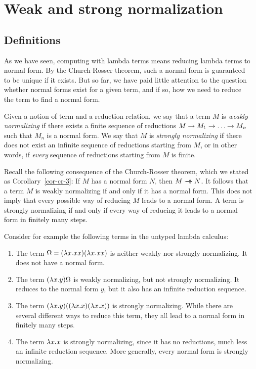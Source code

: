 \documentclass{article}
\begin{document}
\section{Weak and strong normalization}

\subsection{Definitions}

As we have seen, computing with lambda terms means reducing lambda
terms to normal form. By the Church-Rosser theorem, such a normal form
is guaranteed to be unique if it exists. But so far, we have paid
little attention to the question whether normal forms exist for a
given term, and if so, how we need to reduce the term to find a normal
form. 

\begin{definition}
  Given a notion of term and a reduction relation, we say that a term
  $M$ is {\em weakly normalizing} if there exists a finite sequence of
  reductions $M\rightarrow M_1\rightarrow\ldots\rightarrow M_n$ such that $M_n$ is a normal
  form. We say that $M$ is {\em strongly normalizing} if there does
  not exist an infinite sequence of reductions starting from $M$, or
  in other words, if {\em every} sequence of reductions starting from
  $M$ is finite. 
\end{definition}

Recall the following consequence of the Church-Rosser theorem, which
we stated as Corollary~\ref{cor-cr-3}: If $M$ has a normal form $N$,
then $M\mathrel{\rightarrow\!\!\!\!\!\rightarrow} N$. It follows that a term $M$ is weakly normalizing if
and only if it has a normal form. This does not imply that every
possible way of reducing $M$ leads to a normal form. A term is
strongly normalizing if and only if every way of reducing it leads to
a normal form in finitely many steps. 

Consider for example the following terms in the untyped lambda
calculus:
\begin{enumerate}
\item The term $\Omega=(\lambda x.xx)(\lambda x.xx)$ is neither weakly nor
  strongly normalizing. It does not have a normal form.
\item The term $(\lambda x.y)\Omega$ is weakly normalizing, but not
  strongly normalizing. It reduces to the normal form $y$, but it also
  has an infinite reduction sequence.
\item The term $(\lambda x.y)((\lambda x.x)(\lambda x.x))$ is strongly
  normalizing. While there are several different ways to reduce this
  term, they all lead to a normal form in finitely many steps. 
\item The term $\lambda x.x$ is strongly normalizing, since it has no
  reductions, much less an infinite reduction sequence. More
  generally, every normal form is strongly normalizing.
\end{enumerate}
\end{document}
